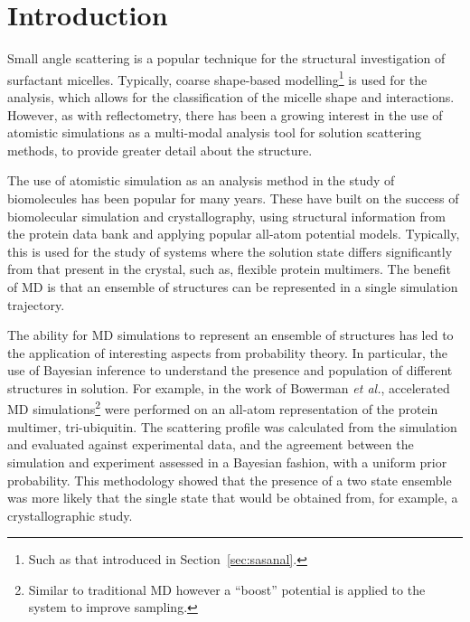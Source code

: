 \section{Introduction}

Small angle scattering is a popular technique for the structural investigation of surfactant micelles.\autocite{sanchez-fernandez_micellization_2016}
Typically, coarse shape-based modelling\footnote{Such as that introduced in Section~\ref{sec:sasanal}.} is used for the analysis, which allows for the classification of the micelle shape and interactions.
However, as with reflectometry, there has been a growing interest in the use of atomistic simulations as a multi-modal analysis tool for solution scattering methods,\autocite{ivanovic_temperature-dependent_2018} to provide greater detail about the structure.

The use of atomistic simulation as an analysis method in the study of biomolecules has been popular for many years.\autocite{perkins_solution_1991,mayans_demonstration_1995,hub_interpreting_2018}
These have built on the success of biomolecular simulation and crystallography, using structural information from the protein data bank\autocite{noauthor_rcsb_nodate} and applying popular all-atom potential models.
Typically, this is used for the study of systems where the solution state differs significantly from that present in the crystal, such as, flexible protein multimers.
The benefit of MD is that an ensemble of structures can be represented in a single simulation trajectory.\autocite{chen_validating_2014,bowerman_determining_2017}

The ability for MD simulations to represent an ensemble of structures has led to the application of interesting aspects from probability theory.
In particular, the use of Bayesian inference to understand the presence and population of different structures in solution.
For example, in the work of Bowerman \emph{et al.},\autocite{bowerman_determining_2017} accelerated MD simulations\footnote{Similar to traditional MD however a ``boost'' potential is applied to the system to improve sampling.} were performed on an all-atom representation of the protein multimer, tri-ubiquitin.
The scattering profile was calculated from the simulation and evaluated against experimental data, and the agreement between the simulation and experiment assessed in a Bayesian fashion, with a uniform prior probability.
This methodology showed that the presence of a two state ensemble was more likely that the single state that would be obtained from, for example, a crystallographic study.

